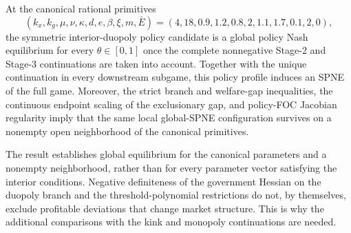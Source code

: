 \begin{proposition}
\label{prop:global-spne}
At the canonical rational primitives
\[
(k_x,k_g,\mu,\nu,\kappa,d,e,\beta,\xi,m,\bar E)
=(4,18,0.9,1.2,0.8,2,1.1,1.7,0.1,2,0),
\]
the symmetric interior-duopoly policy candidate is a global policy Nash equilibrium for every $\theta\in[0,1]$ once the complete nonnegative Stage-2 and Stage-3 continuations are taken into account. Together with the unique continuation in every downstream subgame, this policy profile induces an SPNE of the full game. Moreover, the strict branch and welfare-gap inequalities, the continuous endpoint scaling of the exclusionary gap, and policy-FOC Jacobian regularity imply that the same local global-SPNE configuration survives on a nonempty open neighborhood of the canonical primitives.
\end{proposition}

The result establishes global equilibrium for the canonical parameters and a nonempty neighborhood, rather than for every parameter vector satisfying the interior conditions. Negative definiteness of the government Hessian on the duopoly branch and the threshold-polynomial restrictions do not, by themselves, exclude profitable deviations that change market structure. This is why the additional comparisons with the kink and monopoly continuations are needed.